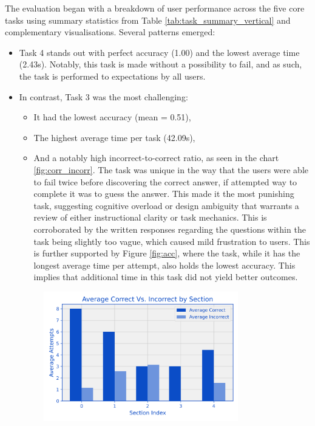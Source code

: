 The evaluation began with a breakdown of user performance across the five core tasks using summary statistics from Table \ref{tab:task_summary_vertical} and complementary visualisations.
Several patterns emerged:
\begin{itemize}
        \item Task 4 stands out with perfect accuracy (1.00) and the lowest average time (2.43s). 
        Notably, this task is made without a possibility to fail, and as such, the task is performed to expectations by all users.
        \item In contrast, Task 3 was the most challenging:
        \begin{itemize}
            \item It had the lowest accuracy (mean = 0.51),
            \item The highest average time per task (42.09s),
            \item And a notably high incorrect-to-correct ratio, as seen in the chart \ref{fig:corr_incorr}. 
            The task was unique in the way that the users were able to fail twice before discovering the correct answer, if attempted way to complete it was to guess the answer. 
            This made it the most punishing task, suggesting cognitive overload or design ambiguity that warrants a review of either instructional clarity or task mechanics. 
            This is corroborated by the written responses regarding the questions within the task being slightly too vague, which caused mild frustration to users. 
            This is further supported by Figure \ref{fig:acc}, where the task, while it has the longest average time per attempt, also holds the lowest accuracy. 
            This implies that additional time in this task did not yield better outcomes.
        \end{itemize}
        \begin{figure}[hbtp]
        \centering
        \includegraphics[width=0.8\textwidth]{figures/mean_correct_incorrect.png}

\end{figure}
\end{itemize}
